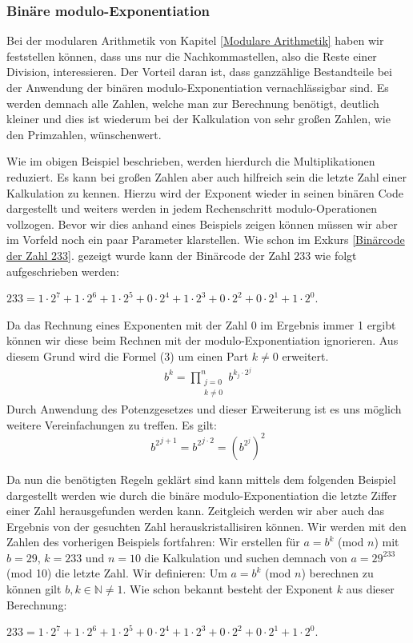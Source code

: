 \documentclass[12pt,a4paper]{article}
\theoremstyle{definition}
\begin{document}
\subsubsection{Binäre modulo-Exponentiation}\label{Binäre modulo-Exponentiation}
Bei der modularen Arithmetik von Kapitel \ref{Modulare Arithmetik} haben wir feststellen können, dass uns nur die Nachkommastellen, also die Reste einer Division, interessieren.
Der Vorteil daran ist, dass ganzzählige Bestandteile bei der Anwendung der binären modulo-Exponentiation vernachlässigbar sind.
Es werden demnach alle Zahlen, welche man zur Berechnung benötigt, deutlich kleiner und dies ist wiederum bei der Kalkulation von sehr großen Zahlen, wie den Primzahlen, wünschenwert.

Wie im obigen Beispiel beschrieben, werden hierdurch die Multiplikationen reduziert.
Es kann bei großen Zahlen aber auch hilfreich sein die letzte Zahl einer Kalkulation zu kennen.
Hierzu wird der Exponent wieder in seinen binären Code dargestellt und weiters werden in jedem Rechenschritt modulo-Operationen vollzogen.\newline
Bevor wir dies anhand eines Beispiels zeigen können müssen wir aber im Vorfeld noch ein paar Parameter klarstellen. Wie schon im Exkurs \ref{Binärcode der Zahl 233}. gezeigt wurde kann der Binärcode der Zahl 233 wie folgt aufgeschrieben werden:
\begin{center}
$233 = 1 \cdot 2^7 + 1 \cdot 2^6 + 1 \cdot2^5 + 0 \cdot2^4 + 1 \cdot 2^3 + 0 \cdot2^2 + 0 \cdot 2^1 + 1 \cdot 2^0$.
\end{center}
Da das Rechnung eines Exponenten mit der Zahl 0 im Ergebnis immer 1 ergibt können wir diese beim Rechnen mit der modulo-Exponentiation ignorieren. Aus diesem Grund wird die Formel (3) um einen Part $k \neq 0$ erweitert.
\begin{align}
b^k = \prod_{\substack{j=0\\k\neq0}}^n b^{k_j \cdot 2^j}
\end{align}
Durch Anwendung des Potenzgesetzes und dieser Erweiterung ist es uns möglich weitere Vereinfachungen zu treffen. Es gilt:
\[{b^2}^{j+1} = {b^2}^{j \cdot 2} = (b^{2^j})^2\]


Da nun die benötigten Regeln geklärt sind kann mittels dem folgenden Beispiel dargestellt werden wie durch die binäre modulo-Exponentiation die letzte Ziffer einer Zahl herausgefunden werden kann. Zeitgleich werden wir aber auch das Ergebnis von der gesuchten Zahl herauskristallisiren können.
Wir werden mit den Zahlen des vorherigen Beispiels fortfahren:
\newline
Wir erstellen für $a = b^k$ (mod $n$) mit $b = 29$, $k = 233$ und $n = 10$ die Kalkulation und suchen demnach von $a = 29^{233}$ (mod 10) die letzte Zahl.\newline
Wir definieren: Um $a = b^k$ (mod $n$) berechnen zu können gilt $b, k \in \mathbb{N} \neq 1$.
Wie schon bekannt besteht der Exponent $k$ aus dieser Berechnung:
\begin{center}
$233 = 1 \cdot 2^7 + 1 \cdot 2^6 + 1 \cdot2^5 + 0 \cdot2^4 + 1 \cdot 2^3 + 0 \cdot2^2 + 0 \cdot 2^1 + 1 \cdot 2^0$.
\end{center}
\end{document}
